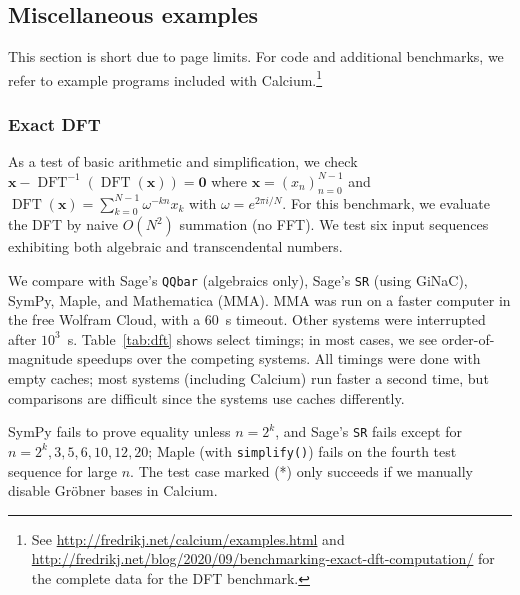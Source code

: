\documentclass[sigconf,screen,urlbreakonhyphens]{acmart}
\begin{document}
\subsection{Miscellaneous examples}

This section is short due to page limits.
For code and additional benchmarks, we refer to
example programs included with Calcium.\footnote{See \url{http://fredrikj.net/calcium/examples.html}
and \url{http://fredrikj.net/blog/2020/09/benchmarking-exact-dft-computation/} for the complete data for the DFT benchmark.}

\subsubsection{Exact DFT}

As a test of basic arithmetic and simplification,
we check $\textbf{x} - \operatorname{DFT}^{-1}(\operatorname{DFT}(\textbf{x})) = \textbf{0}$
where $\textbf{x} = (x_n)_{n=0}^{N-1}$ and $\operatorname{DFT}(\textbf{x}) = \sum_{k=0}^{N-1} \omega^{-kn} x_k$
with $\omega = e^{2 \pi i / N}$. For this benchmark, we evaluate
the DFT by naive $O(N^2)$ summation (no FFT).
We test six input sequences exhibiting both algebraic and transcendental numbers.

We compare with Sage's \texttt{QQbar} (algebraics only), Sage's \texttt{SR} (using GiNaC),
SymPy, Maple, and Mathematica (MMA).
MMA was run on a faster computer in the free Wolfram Cloud, with a 60~s timeout. Other systems were interrupted after $10^3$~s.
Table~\ref{tab:dft} shows select timings;
in most cases, we see order-of-magnitude speedups over
the competing systems.
All timings were done with empty caches;
most systems (including Calcium) run faster a second time,
but comparisons are difficult since
the systems use caches differently.

SymPy fails to prove equality unless $n = 2^k$, and Sage's \texttt{SR} fails except for $n = 2^k, 3, 5, 6, 10, 12, 20$;
Maple (with \texttt{simplify()}) fails on the fourth test sequence for large $n$.
The test case marked (*) only succeeds if we manually disable Gr\"{o}bner bases in Calcium.
\end{document}
